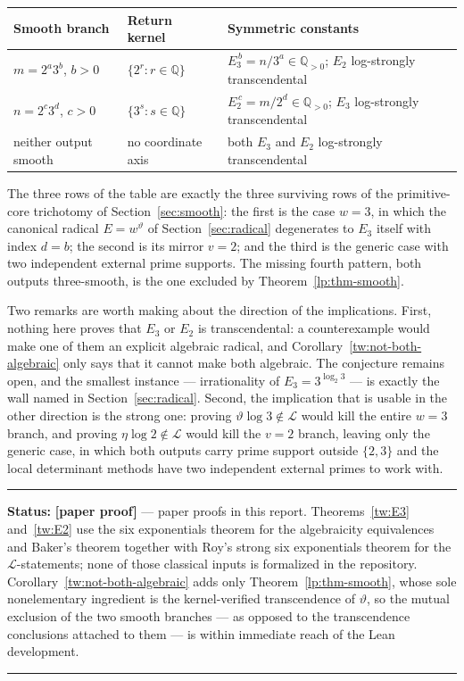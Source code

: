 \documentclass[11pt,oneside]{article}
\theoremstyle{definition}
\theoremstyle{remark}
\newcommand{\Q}{\mathbb Q}
\newcommand{\thetaq}{\vartheta}
\newcommand{\LL}{\mathcal L}
\newcommand{\statusnew}{\textcolor{newgreen}{\textbf{[paper proof]}}}
\newenvironment{statusbox}[1]
{\begin{center}\begin{minipage}{0.94\textwidth}\raggedright\hbadness=10000\hrule
\vspace{0.45em}\textbf{Status:} #1\par\vspace{0.35em}}
{\vspace{0.35em}\hrule\end{minipage}\end{center}}
\begin{document}
\begin{center}
\begin{tabular}{@{}p{}p{}p{}@{}}
\toprule
Smooth branch & Return kernel & Symmetric constants\\
\midrule
$m=2^a3^b$, $b>0$ & $\{2^r:r\in\Q\}$ &
$E_3^{\,b}=n/3^a\in\Q_{>0}$; $E_2$ log-strongly transcendental\\
$n=2^c3^d$, $c>0$ & $\{3^s:s\in\Q\}$ &
$E_2^{\,c}=m/2^d\in\Q_{>0}$; $E_3$ log-strongly transcendental\\
neither output smooth & no coordinate axis &
both $E_3$ and $E_2$ log-strongly transcendental\\
\bottomrule
\end{tabular}
\end{center}

The three rows of the table are exactly the three surviving rows of the primitive-core
trichotomy of Section~\ref{sec:smooth}: the first is the case $w=3$, in which the canonical
radical $E=w^{\thetaq}$ of Section~\ref{sec:radical} degenerates to $E_3$ itself with index
$d=b$; the second is its mirror $v=2$; and the third is the generic case with two independent
external prime supports.  The missing fourth pattern, both outputs three-smooth, is the one
excluded by Theorem~\ref{lp:thm-smooth}.

Two remarks are worth making about the direction of the implications.  First, nothing here
proves that $E_3$ or $E_2$ is transcendental: a counterexample would make one of them an
explicit algebraic radical, and Corollary~\ref{tw:not-both-algebraic} only says that it cannot
make both algebraic.  The conjecture remains open, and the smallest instance --- irrationality
of $E_3=3^{\log_2 3}$ --- is exactly the wall named in Section~\ref{sec:radical}.  Second, the
implication that is usable in the other direction is the strong one: proving
$\thetaq\log3\notin\LL$ would kill the entire $w=3$ branch, and proving $\eta\log2\notin\LL$
would kill the $v=2$ branch, leaving only the generic case, in which both outputs carry prime
support outside $\{2,3\}$ and the local determinant methods have two independent external
primes to work with.

\begin{statusbox}{\statusnew{} --- paper proofs in this report.
Theorems~\ref{tw:E3} and~\ref{tw:E2} use the six exponentials theorem for the algebraicity
equivalences and Baker's theorem together with Roy's strong six exponentials theorem for the
$\LL$-statements; none of those classical inputs is formalized in the repository.
Corollary~\ref{tw:not-both-algebraic} adds only Theorem~\ref{lp:thm-smooth}, whose
sole nonelementary ingredient is the kernel-verified transcendence of $\thetaq$, so the
mutual exclusion of the two smooth branches --- as opposed to the transcendence conclusions
attached to them --- is within immediate reach of the Lean development.}
\end{statusbox}
\end{document}
